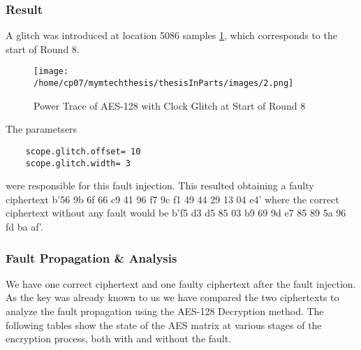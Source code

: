 \subsubsection{Result}
A glitch was introduced at location 5086 samples \ref{fig:clock_glitch_trace}, which corresponds to the start of Round 8. 
\begin{figure}[h]
    \centering
    \texttt{[image: /home/cp07/mymtechthesis/thesisInParts/images/2.png]}
    \caption{Power Trace of AES-128 with Clock Glitch at Start of Round 8}
    \label{fig:clock_glitch_trace}
\end{figure}
The parametsers 
\begin{verbatim}
    scope.glitch.offset= 10
    scope.glitch.width= 3
\end{verbatim}
were responsible for this fault injection. This resulted obtaining a faulty ciphertext b'56 9b 6f 66 c9 41 96 f7 9c f1 49 44 29 13 04 e4' where the correct ciphertext without any fault would be b'f5 d3 d5 85 03 b9 69 9d e7 85 89 5a 96 fd ba af'.

\subsubsection{Fault Propagation \& Analysis}
We have one correct ciphertext and one faulty ciphertext after the fault injection. As the key was already known to us we have compared the two ciphertexts to analyze the fault propagation using the AES-128 Decryption method. The following tables show the state of the AES matrix at various stages of the encryption process, both with and without the fault.



